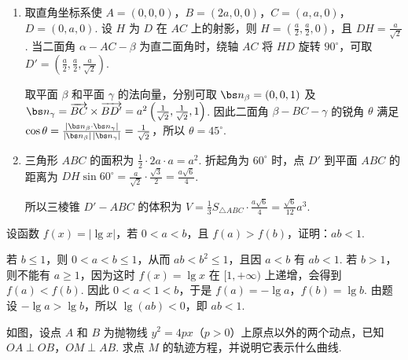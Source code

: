 \begin{solution}
\begin{enumerate}
\item 取直角坐标系使 \(A=(0,0,0)\)，\(B=(2a,0,0)\)，\(C=(a,a,0)\)，\(D=(0,a,0)\). 设 \(H\) 为 \(D\) 在 \(AC\) 上的射影，则 \(H=\left(\frac{a}{2},\frac{a}{2},0\right)\)，且 \(DH=\frac{a}{\sqrt{2}}\). 当二面角 \(\alpha-AC-\beta\) 为直二面角时，绕轴 \(AC\) 将 \(HD\) 旋转 \(90^{\circ}\)，可取 \(D'=\left(\frac{a}{2},\frac{a}{2},\frac{a}{\sqrt{2}}\right)\).

取平面 \(\beta\) 和平面 \(\gamma\) 的法向量，分别可取 \(\bs n_{\beta}=(0,0,1)\) 及 \(\bs n_{\gamma}=\overrightarrow{BC}\times\overrightarrow{BD'}=a^{2}\left(\frac{1}{\sqrt{2}},\frac{1}{\sqrt{2}},1\right)\). 因此二面角 \(\beta-BC-\gamma\) 的锐角 \(\theta\) 满足 \(\cos\theta=\frac{|\bs n_{\beta}\cdot\bs n_{\gamma}|}{|\bs n_{\beta}|\,|\bs n_{\gamma}|}=\frac{1}{\sqrt{2}}\)，所以 \(\theta=45^{\circ}\).

\item 三角形 \(ABC\) 的面积为 \(\frac{1}{2}\cdot 2a\cdot a=a^{2}\). 折起角为 \(60^{\circ}\) 时，点 \(D'\) 到平面 \(ABC\) 的距离为 \(DH\sin60^{\circ}=\frac{a}{\sqrt{2}}\cdot\frac{\sqrt{3}}{2}=\frac{a\sqrt{6}}{4}\).

所以三棱锥 \(D'-ABC\) 的体积为 \(V=\frac{1}{3}S_{\triangle ABC}\cdot\frac{a\sqrt{6}}{4}=\frac{\sqrt{6}}{12}a^{3}\).
\end{enumerate}
\end{solution}

\begin{problem}
设函数 \(f(x)=|\lg x|\)，若 \(0<a<b\)，且 \(f(a)>f(b)\)，证明：\(ab<1\).
\end{problem}

\begin{solution}
若 \(b\leq1\)，则 \(0<a<b\leq1\)，从而 \(ab<b^{2}\leq1\)，且因 \(a<b\) 有 \(ab<1\). 若 \(b>1\)，则不能有 \(a\geq1\)，因为这时 \(f(x)=\lg x\) 在 \([1,+\infty)\) 上递增，会得到 \(f(a)<f(b)\). 因此 \(0<a<1<b\)，于是 \(f(a)=-\lg a\)，\(f(b)=\lg b\). 由题设 \(-\lg a>\lg b\)，所以 \(\lg(ab)<0\)，即 \(ab<1\).
\end{solution}

\begin{problem}
如图，设点 \(A\) 和 \(B\) 为抛物线 \(y^{2}=4px\)（\(p>0\)）上原点以外的两个动点，已知 \(OA\perp OB\)，\(OM\perp AB\). 求点 \(M\) 的轨迹方程，并说明它表示什么曲线.

\end{problem}

